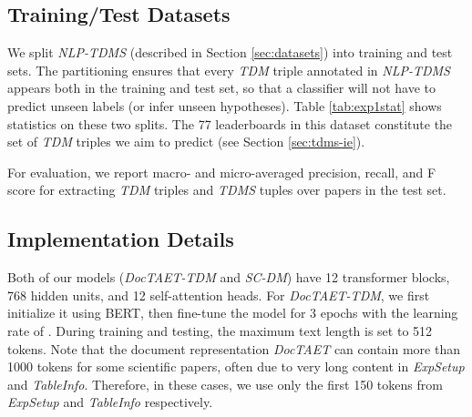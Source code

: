 \documentclass[11pt,a4paper]{article}
\newcommand{\fb}[1]{[FB:#1]}
\begin{document}
\subsection{Training/Test Datasets}
We split \emph{NLP-TDMS} (described in Section \ref{sec:datasets}) into training and test sets. 
The partitioning ensures that every \emph{TDM} triple annotated in \emph{NLP-TDMS} appears both in the training and test set, so that a classifier will not have to predict unseen labels (or infer unseen hypotheses).
Table \ref{tab:exp1stat} shows statistics on these two splits.
The 77 leaderboards in this dataset constitute the set of  \emph{TDM} triples we aim to predict (see Section \ref{sec:tdms-ie}). 

For evaluation, we report macro- and micro-averaged precision, recall, and F score for extracting \emph{TDM} triples and \emph{TDMS} tuples over papers in the test set.
\begin{comment}
\fb{cj: not sure the following is needed}
Since this output could ultimately be used to generate a leaderboard, i.e., a ranked list of papers ordered by performance, it seems natural to measure how close our generated leaderboards are to manually curated ones using some rank correlation (e.g., Spearman's  or Kendall's ).
However, rank correlations are typically used when the order of the ranking is defined by the system, e.g., some relevance, similarity, or confidence score. 
In this work, the score is extracted from the paper and not any reflection of our system's confidence.
With a rank correlation it would be possible to have two systems that both make one error in labeling, but that get different scores because of the arbitrary position in which the mistake was made.
\end{comment}





\subsection{Implementation Details}\label{sec:nn_detail}
Both of our models (\emph{DocTAET-TDM} and \emph{SC-DM}) have 12 transformer blocks, 768 hidden units, and 12 self-attention heads.
For \emph{DocTAET-TDM},
we first  initialize it using BERT, then fine-tune the model for 3 epochs with the learning rate of .
During training and testing,  the maximum text length is set to 512 tokens.
Note that the document representation \emph{DocTAET} can contain more than 1000 tokens for some scientific papers, often due to very long content in \emph{ExpSetup} and \emph{TableInfo}. 
Therefore, in these cases, we use only the first 150 tokens from \emph{ExpSetup} and \emph{TableInfo} respectively.
\end{document}
